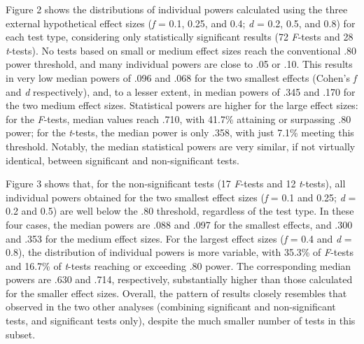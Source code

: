 \documentclass[authordate, meta, issue]{jote-new-article}
\begin{document}
	Figure 2 shows the distributions of individual powers calculated using the three external hypothetical effect sizes (\emph{f} = 0.1, 0.25, and 0.4; \emph{d} = 0.2, 0.5, and 0.8) for each test type, considering only statistically significant results (72 \emph{F}-tests and 28 \emph{t}-tests). No tests based on small or medium effect sizes reach the conventional .80 power threshold, and many individual powers are close to .05 or .10. This results in very low median powers of .096 and .068 for the two smallest effects (Cohen's \emph{f} and \emph{d} respectively), and, to a lesser extent, in median powers of .345 and .170 for the two medium effect sizes. Statistical powers are higher for the large effect sizes: for the \emph{F}-tests, median values reach .710, with 41.7\% attaining or surpassing .80 power; for the \emph{t}-tests, the median power is only .358, with just 7.1\% meeting this threshold. Notably, the median statistical powers are very similar, if not virtually identical, between significant and non-significant tests.



	Figure 3 shows that, for the non-significant tests (17 \emph{F}-tests and 12 \emph{t}-tests), all individual powers obtained for the two smallest effect sizes (\emph{f} = 0.1 and 0.25; \emph{d} = 0.2 and 0.5) are well below the .80 threshold, regardless of the test type. In these four cases, the median powers are .088 and .097 for the smallest effects, and .300 and .353 for the medium effect sizes. For the largest effect sizes (\emph{f} = 0.4 and \emph{d} = 0.8), the distribution of individual powers is more variable, with 35.3\% of \emph{F}-tests and 16.7\% of \emph{t}-tests reaching or exceeding .80 power. The corresponding median powers are .630 and .714, respectively, substantially higher than those calculated for the smaller effect sizes. Overall, the pattern of results closely resembles that observed in the two other analyses (combining significant and non-significant tests, and significant tests only), despite the much smaller number of tests in this subset.
\end{document}
